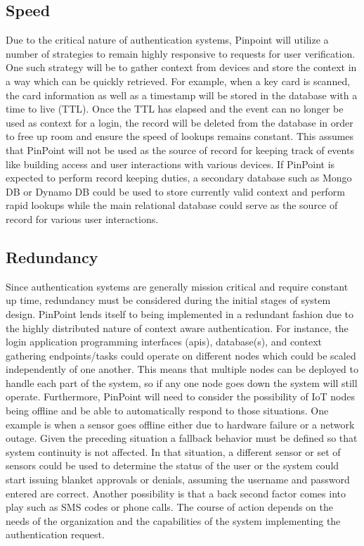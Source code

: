 \documentclass[11pt,journal]{IEEEtran}
\begin{document}
\subsection{Speed}
Due to the critical nature of authentication systems, Pinpoint will utilize a number of strategies to remain highly responsive to requests for user verification. One such strategy will be to gather context from devices and store the context in a way which can be quickly retrieved. For example, when a key card is scanned, the card information as well as a timestamp will be stored in the database with a time to live (TTL). Once the TTL has elapsed and the event can no longer be used as context for a login, the record will be deleted from the database in order to free up room and ensure the speed of lookups remains constant. This assumes that PinPoint will not be used as the source of record for keeping track of events like building access and user interactions with various devices. If PinPoint is expected to perform record keeping duties, a secondary database such as Mongo DB or Dynamo DB could be used to store currently valid context and perform rapid lookups while the main relational database could serve as the source of record for various user interactions.

\subsection{Redundancy}
Since authentication systems are generally mission critical and require constant up time, redundancy must be considered during the initial stages of system design. PinPoint lends itself to being implemented in a redundant fashion due to the highly distributed nature of context aware authentication. For instance, the login application programming interfaces (apis), database(s), and context gathering endpoints/tasks could operate on different nodes which could be scaled independently of one another. This means that multiple nodes can be deployed to handle each part of the system, so if any one node goes down the system will still operate. Furthermore, PinPoint will need to consider the possibility of IoT nodes being offline and be able to automatically respond to those situations. One example is when a sensor goes offline either due to hardware failure or a network outage. Given the preceding situation a fallback behavior must be defined so that system continuity is not affected. In that situation, a different sensor or set of sensors could be used to determine the status of the user or the system could start issuing blanket approvals or denials, assuming the username and password entered are correct. Another possibility is that a back second factor comes into play such as SMS codes or phone calls. The course of action depends on the needs of the organization and the capabilities of the system implementing the authentication request.
\end{document}
